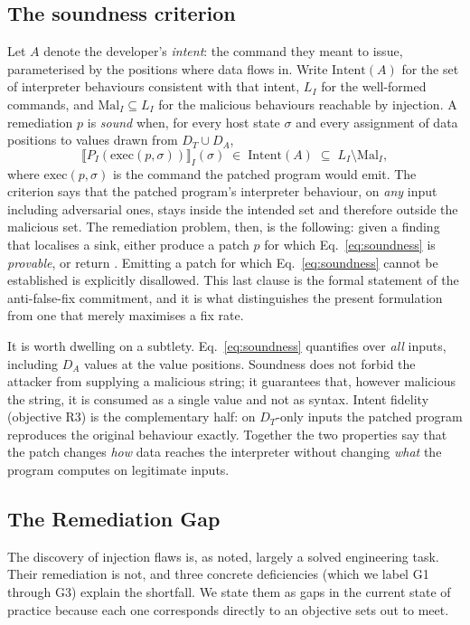 \subsection{The soundness criterion}
\label{sec:soundness-crit}

Let $A$ denote the developer's \emph{intent}: the command they meant to
issue, parameterised by the positions where data flows in. Write
$\mathrm{Intent}(A)$ for the set of interpreter behaviours consistent with
that intent, $L_I$ for the well-formed commands, and $\mathrm{Mal}_I
\subseteq L_I$ for the malicious behaviours reachable by injection. A
remediation $p$ is \emph{sound} when, for every host state $\sigma$ and
every assignment of data positions to values drawn from $D_T \cup D_A$,
\begin{equation}
  \llbracket P_I(\mathrm{exec}(p,\sigma))\rrbracket_I(\sigma)
     \;\in\; \mathrm{Intent}(A) \;\subseteq\; L_I \setminus \mathrm{Mal}_I ,
  \label{eq:soundness}
\end{equation}
where $\mathrm{exec}(p,\sigma)$ is the command the patched program would
emit. The criterion says that the patched program's interpreter behaviour,
on \emph{any} input including adversarial ones, stays inside the intended
set and therefore outside the malicious set. The remediation problem, then,
is the following: given a finding that localises a sink, either produce a
patch $p$ for which Eq.~\eqref{eq:soundness} is \emph{provable}, or return
\bottom{}. Emitting a patch for which Eq.~\eqref{eq:soundness} cannot be
established is explicitly disallowed. This last clause is the formal
statement of the anti-false-fix commitment, and it is what distinguishes the
present formulation from one that merely maximises a fix rate.

It is worth dwelling on a subtlety. Eq.~\eqref{eq:soundness} quantifies over
\emph{all} inputs, including $D_A$ values at the value positions. Soundness
does not forbid the attacker from supplying a malicious string; it
guarantees that, however malicious the string, it is consumed as a single
value and not as syntax. Intent fidelity (objective R3) is the complementary
half: on $D_T$-only inputs the patched program reproduces the original
behaviour exactly. Together the two properties say that the patch changes
\emph{how} data reaches the interpreter without changing \emph{what} the
program computes on legitimate inputs.

\subsection{The Remediation Gap}
\label{sec:gap}
The discovery of injection flaws
is, as noted, largely a solved engineering task. Their remediation is not,
and three concrete deficiencies (which we label G1 through G3) explain the
shortfall. We state them as gaps in the current state of practice because
each one corresponds directly to an objective \irsam{} sets out to meet.

